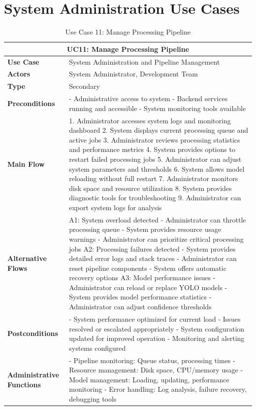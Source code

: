\documentclass{article}
\begin{document}
\section{System Administration Use Cases}

\begin{table}[H]
\centering
\begin{tabularx}{\textwidth}{|l|X|}
\hline
\multicolumn{2}{|c|}{\textbf{UC11: Manage Processing Pipeline}} \\ \hline
\textbf{Use Case} & System Administration and Pipeline Management \\ \hline
\textbf{Actors} & System Administrator, Development Team \\ \hline
\textbf{Type} & Secondary \\ \hline
\textbf{Preconditions} & 
- Administrative access to system
- Backend services running and accessible
- System monitoring tools available \\ \hline
\textbf{Main Flow} & 
1. Administrator accesses system logs and monitoring dashboard
2. System displays current processing queue and active jobs
3. Administrator reviews processing statistics and performance metrics
4. System provides options to restart failed processing jobs
5. Administrator can adjust system parameters and thresholds
6. System allows model reloading without full restart
7. Administrator monitors disk space and resource utilization
8. System provides diagnostic tools for troubleshooting
9. Administrator can export system logs for analysis \\ \hline
\textbf{Alternative Flows} & 
A1: System overload detected
- Administrator can throttle processing queue
- System provides resource usage warnings
- Administrator can prioritize critical processing jobs
A2: Processing failures detected
- System provides detailed error logs and stack traces
- Administrator can reset pipeline components
- System offers automatic recovery options
A3: Model performance issues
- Administrator can reload or replace YOLO models
- System provides model performance statistics
- Administrator can adjust confidence thresholds \\ \hline
\textbf{Postconditions} & 
- System performance optimized for current load
- Issues resolved or escalated appropriately
- System configuration updated for improved operation
- Monitoring and alerting systems configured \\ \hline
\textbf{Administrative Functions} & 
- Pipeline monitoring: Queue status, processing times
- Resource management: Disk space, CPU/memory usage
- Model management: Loading, updating, performance monitoring
- Error handling: Log analysis, failure recovery, debugging tools \\ \hline
\end{tabularx}
\caption{Use Case 11: Manage Processing Pipeline}
\end{table}
\end{document}
